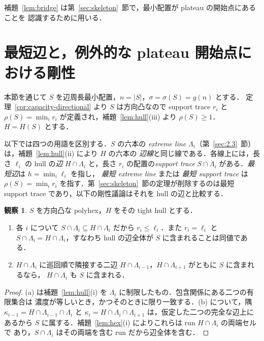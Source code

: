 \documentclass[11pt]{article}
\theoremstyle{plain}
\theoremstyle{definition}
\newtheorem{observation}[theorem]{観察}
\theoremstyle{remark}
\begin{document}
補題~\ref{lem:bridge} は第~\ref{sec:skeleton}~節で，最小配置が plateau の開始点にあることを
認識するために用いる．


\section{最短辺と，例外的な plateau 開始点における剛性}\label{sec:rigidity}

本節を通じて \(S\) を辺周長最小配置，\(n=|S|\)，\(\sigma=\sigma(S)=g(n)\) とする．
定理~\ref{cor:capacity-directional} より \(S\) は方向凸なので support trace \(r_{i}\) と
\(\rho(S)=\min_{i}r_{i}\) が定義され，補題~\ref{lem:hull}(iii) より \(\rho(S)\ge1\)．
\(H=H(S)\) とする．

以下では四つの用語を区別する．\(S\) の六本の \emph{extreme line}
\(\Lambda_i\)（第~\ref{sec:2.3}~節）は，補題~\ref{lem:hull}(ii) により \(H\) の六本の
\emph{辺線}と同じ線である．各線上には，長さ \(\ell_i\) の hull の\emph{辺}
\(H\cap\Lambda_i\) と，長さ \(r_i\) の配置の\emph{support trace}
\(S\cap\Lambda_i\) がある．\emph{最短辺}は \(h=\min_i\ell_i\) を指し，
\emph{最短 extreme line} または \emph{最短 support trace} は
\(\rho(S)=\min_i r_i\) を指す．第~\ref{sec:skeleton}~節の定理が削除するのは最短 support
trace であり，以下の剛性議論はそれを hull の辺と比較する．

\begin{observation}\label{obs:fullside}
\(S\) を方向凸な polyhex，\(H\) をその tight hull とする．
\begin{enumerate}
\item[(a)] 各 \(i\) について \(S\cap\Lambda_i\subseteq H\cap\Lambda_i\) だから
\(r_i\le\ell_i\)．また \(r_i=\ell_i\) と
\(S\cap\Lambda_i=H\cap\Lambda_i\)，すなわち hull の辺全体が \(S\) に含まれることは同値である．
\item[(b)] \(H\cap\Lambda_i\) に巡回順で隣接する二辺
\(H\cap\Lambda_{i-1}\)，\(H\cap\Lambda_{i+1}\) がともに \(S\) に含まれるなら，
\(H\cap\Lambda_i\) も \(S\) に含まれる．
\end{enumerate}
\end{observation}

\begin{proof}
(a) は補題~\ref{lem:hull}(i) を \(\Lambda_i\) に制限したもの．包含関係にある二つの有限集合は
濃度が等しいとき，かつそのときに限り一致する．(b) について，隅
\(\kappa_{i-1}=H\cap\Lambda_{i-1}\cap\Lambda_i\) と
\(\kappa_i=H\cap\Lambda_i\cap\Lambda_{i+1}\) は，仮定した二つの完全な辺上にあるから
\(S\) に属する．補題~\ref{lem:hex}(i) によりこれらは run \(H\cap\Lambda_i\) の両端セルで
あり，\(S\cap\Lambda_i\) はその両端を含む run だから辺全体を含む．
\end{proof}
\end{document}
